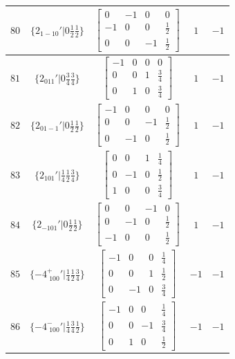 \documentclass[fleqn,8pt]{jsarticle}
\begin{document}
\begin{longtable}{ccccc}
$ 80 $ & $ \{2{}_{1-10}{}'|0 \frac{1}{2} \frac{1}{2}\} $ & $ \begin{bmatrix} 0 & -1 & 0 & 0 \\ -1 & 0 & 0 & \frac{1}{2} \\ 0 & 0 & -1 & \frac{1}{2} \end{bmatrix} $ & $ 1 $ & $ -1 $ \\ \hline
$ 81 $ & $ \{2{}_{011}{}'|0 \frac{3}{4} \frac{3}{4}\} $ & $ \begin{bmatrix} -1 & 0 & 0 & 0 \\ 0 & 0 & 1 & \frac{3}{4} \\ 0 & 1 & 0 & \frac{3}{4} \end{bmatrix} $ & $ 1 $ & $ -1 $ \\ \hline
$ 82 $ & $ \{2{}_{01-1}{}'|0 \frac{1}{2} \frac{1}{2}\} $ & $ \begin{bmatrix} -1 & 0 & 0 & 0 \\ 0 & 0 & -1 & \frac{1}{2} \\ 0 & -1 & 0 & \frac{1}{2} \end{bmatrix} $ & $ 1 $ & $ -1 $ \\ \hline
$ 83 $ & $ \{2{}_{101}{}'|\frac{1}{4} \frac{1}{2} \frac{3}{4}\} $ & $ \begin{bmatrix} 0 & 0 & 1 & \frac{1}{4} \\ 0 & -1 & 0 & \frac{1}{2} \\ 1 & 0 & 0 & \frac{3}{4} \end{bmatrix} $ & $ 1 $ & $ -1 $ \\ \hline
$ 84 $ & $ \{2{}_{-101}{}'|0 \frac{1}{2} \frac{1}{2}\} $ & $ \begin{bmatrix} 0 & 0 & -1 & 0 \\ 0 & -1 & 0 & \frac{1}{2} \\ -1 & 0 & 0 & \frac{1}{2} \end{bmatrix} $ & $ 1 $ & $ -1 $ \\ \hline
$ 85 $ & $ \{-4^{+}_{\,\,100}{}'|\frac{1}{4} \frac{1}{2} \frac{3}{4}\} $ & $ \begin{bmatrix} -1 & 0 & 0 & \frac{1}{4} \\ 0 & 0 & 1 & \frac{1}{2} \\ 0 & -1 & 0 & \frac{3}{4} \end{bmatrix} $ & $ -1 $ & $ -1 $ \\ \hline
$ 86 $ & $ \{-4^{-}_{\,\,100}{}'|\frac{1}{4} \frac{3}{4} \frac{1}{2}\} $ & $ \begin{bmatrix} -1 & 0 & 0 & \frac{1}{4} \\ 0 & 0 & -1 & \frac{3}{4} \\ 0 & 1 & 0 & \frac{1}{2} \end{bmatrix} $ & $ -1 $ & $ -1 $ \\ \hline

\end{longtable}
\end{document}
